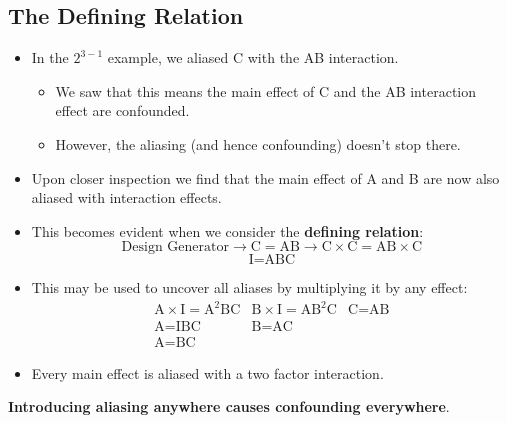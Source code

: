 \subsection{The Defining Relation}
\begin{itemize}
    \item In the $ 2^{3-1} $ example, we aliased C with the AB interaction.
          \begin{itemize}
              \item We saw that this means the main effect of C and the AB interaction effect are confounded.
              \item However, the aliasing (and hence confounding) doesn't stop there.
          \end{itemize}
\end{itemize}
\begin{itemize}[*]
    \item Upon closer inspection we find that the main effect of A and B are now also aliased with interaction
          effects.
\end{itemize}
\begin{itemize}
    \item This becomes evident when we consider the \textbf{defining relation}:
          \[ \text{Design Generator}\rightarrow\text{C}=\text{AB}\rightarrow \text{C}\times\text{C}=\text{AB}\times\text{C} \]
          \[ \text{I}=\text{ABC} \]
    \item This may be used to uncover all aliases by multiplying it by any effect:
          \[ \begin{array}{ccc}
                  \text{A}\times\text{I}=\text{A}^2\text{BC} & \text{B}\times\text{I}=\text{A}\text{B}^2\text{C} & \text{C}=\text{AB} \\
                  \text{A}=\text{IBC}                        & \text{B}=\text{AC}                                                     \\
                  \text{A}=\text{BC}
              \end{array} \]
    \item Every main effect is aliased with a two factor interaction.
\end{itemize}
\begin{framed}
    \begin{tightcenter}
        \textbf{Introducing aliasing anywhere causes confounding everywhere}.
    \end{tightcenter}
\end{framed}

